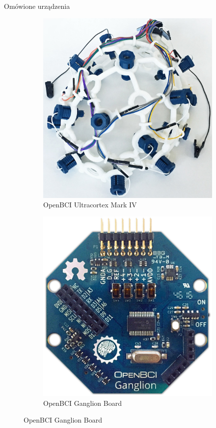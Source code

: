 \documentclass[10pt,aspectratio=169]{beamer}
\begin{document}
\begin{frame}{Omówione urządzenia}
\begin{figure}[htb]
\begin{subfigure}{0.2\linewidth}
    \includegraphics[width=\linewidth,keepaspectratio]{obrazy/markiv}
    \caption{OpenBCI Ultracortex Mark IV}
    \end{subfigure}\hspace*{\fill}
    \begin{subfigure}{0.2\linewidth}
    \includegraphics[width=\linewidth,keepaspectratio]{obrazy/ganglion}
    \caption{OpenBCI Ganglion Board}
    \end{subfigure}
  \end{figure}
\end{frame}
\end{document}
